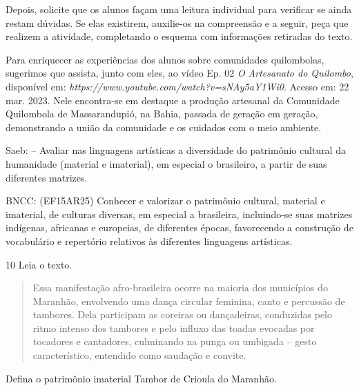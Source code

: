 \begin{escolha}
{Depois, solicite que os alunos façam uma leitura individual
para verificar se ainda restam dúvidas. Se elas existirem, auxilie-os na
compreensão e a seguir, peça que realizem a atividade, completando o
esquema com informações retiradas do
texto.

Para enriquecer as experiências dos alunos
sobre comunidades quilombolas, sugerimos que assista, junto com eles, ao
vídeo Ep. 02 \textbar{} \emph{O Artesanato do Quilombo}, disponível
em: \emph{https://www.youtube.com/watch?v=sNAy5aY1Wi0}. Acesso em: 22 mar.
2023. Nele encontra-se em destaque a produção artesanal da Comunidade
Quilombola de Massarandupió, na Bahia, passada de geração em geração,
demonstrando a união da comunidade e os cuidados com o meio ambiente.

Saeb: -- Avaliar nas linguagens artísticas a diversidade do patrimônio
cultural da humanidade (material e imaterial), em especial o brasileiro,
a partir de suas diferentes matrizes.

BNCC: (EF15AR25) Conhecer e valorizar o patrimônio cultural, material e
imaterial, de culturas diversas, em especial a brasileira, incluindo-se
suas matrizes indígenas, africanas e europeias, de diferentes épocas,
favorecendo a construção de vocabulário e repertório relativos às
diferentes linguagens artísticas.}

\num{10} Leia o texto.
%


\begin{quote}
Essa manifestação afro-brasileira ocorre na maioria dos municípios do
Maranhão, envolvendo uma dança circular feminina, canto e percussão de
tambores. Dela participam as coreiras ou dançadeiras, conduzidas pelo
ritmo intenso dos tambores e pelo influxo das toadas evocadas por
tocadores e cantadores, culminando na punga ou umbigada -- gesto
característico, entendido como saudação e convite.

\end{quote}

Defina o patrimônio imaterial Tambor de Crioula do Maranhão.


\end{escolha}
